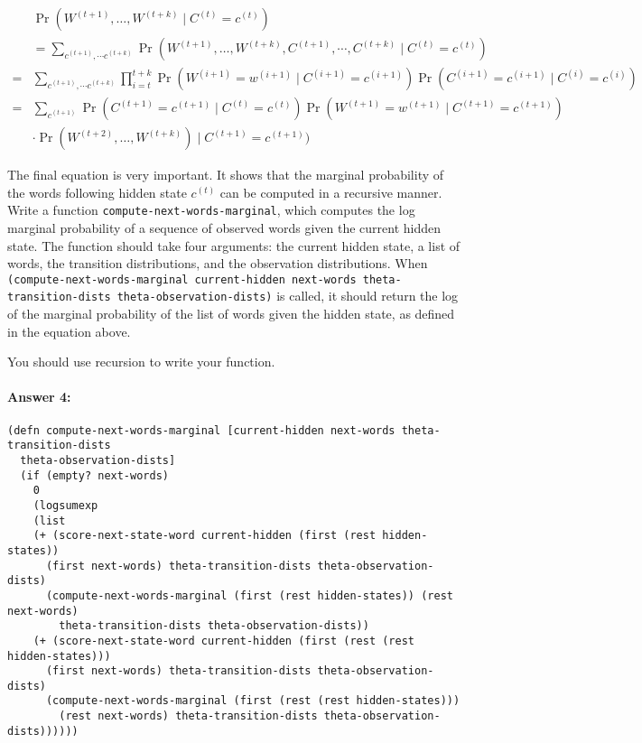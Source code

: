 \documentclass[12pt, letterpaper]{article}
\begin{document}
\begin{align*}
&\Pr(W^{(t+1)},\dots,W^{(t+k)} \mid C^{(t)}=c^{(t)} )\\ 
&= \sum_{c^{(t+1)},\cdots c^{(t+k)}} \Pr(W^{(t+1)},\dots,W^{(t+k)},C^{(t+1)},\cdots,C^{(t+k)} \mid C^{(t)}=c^{(t)} ) \\
=& \sum_{c^{(t+1)},\cdots c^{(t+k)}} \prod_{i=t}^{t+k} \Pr(W^{(i+1)}=w^{(i+1)} \mid C^{(i+1)}=c^{(i+1)}) \Pr(C^{(i+1)} =c^{(i+1)}\mid C^{(i)}=c^{(i)}) \\ 
= & \sum_{c^{(t+1)}} \Pr(C^{(t+1)} =c^{(t+1)}\mid C^{(t)}=c^{(t)}) \Pr(W^{(t+1)} =w^{(t+1)}\mid C^{(t+1)}=c^{(t+1)}) \\
&\cdot \Pr(W^{(t+2)},\dots,W^{(t+k)}) \mid C^{(t+1)}=c^{(t+1)} )
\end{align*}

The final equation is very important. It shows that the marginal
probability of the words following hidden state $c^{(t)}$ can be
computed in a recursive manner. Write a function
\texttt{compute-next-words-marginal}, which computes the log marginal
probability of a sequence of observed words given the current hidden
state. The function should take four arguments: the current hidden
state, a list of words, the transition distributions, and the
observation distributions. When \texttt{(compute-next-words-marginal
  current-hidden next-words theta-transition-dists
  theta-observation-dists)} is called, it should return the log of the
marginal probability of the list of words given the hidden state, as
defined in the equation above.

You should use recursion to write your function. 

\paragraph{Answer 4:}\begin{lstlisting}
(defn compute-next-words-marginal [current-hidden next-words theta-transition-dists 
  theta-observation-dists]
  (if (empty? next-words)
    0
    (logsumexp 
    (list 
    (+ (score-next-state-word current-hidden (first (rest hidden-states)) 
      (first next-words) theta-transition-dists theta-observation-dists) 
      (compute-next-words-marginal (first (rest hidden-states)) (rest next-words) 
        theta-transition-dists theta-observation-dists))
    (+ (score-next-state-word current-hidden (first (rest (rest hidden-states))) 
      (first next-words) theta-transition-dists theta-observation-dists) 
      (compute-next-words-marginal (first (rest (rest hidden-states))) 
        (rest next-words) theta-transition-dists theta-observation-dists))))))
\end{lstlisting}
\end{document}
